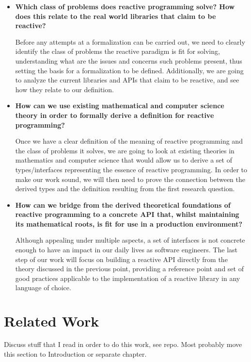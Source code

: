 \begin{itemize}
\item \textbf{Which class of problems does reactive programming solve? How does this relate to the real world libraries that claim to be reactive?}

Before any attempts at a formalization can be carried out, we need to clearly identify the class of problems the reactive paradigm is fit for solving, understanding what are the issues and concerns such problems present, thus setting the basis for a formalization to be defined. Additionally, we are going to analyze the current libraries and APIs that claim to be reactive, and see how they relate to our definition.

\item \textbf{How can we use existing mathematical and computer science theory in order to formally derive a definition for reactive programming?}

Once we have a clear definition of the meaning of reactive programming and the class of problems it solves, we are going to look at existing theories in mathematics and computer science that would allow us to derive a set of types/interfaces representing the essence of reactive programming. In order to make our work sound, we will then need to prove the connection between the derived types and the definition resulting from the first research question.

\item \textbf{How can we bridge from the derived theoretical foundations of reactive programming to a concrete API that, whilst maintaining its mathematical roots, is fit for use in a production environment?}

Although appealing under multiple aspects, a set of interfaces is not concrete enough to have an impact in our daily lives as software engineers. The last step of our work will focus on building a reactive API directly from the theory discussed in the previous point, providing a reference point and set of good practices applicable to the implementation of a reactive library in any language of choice.

\end{itemize}

\section*{Related Work}

Discuss stuff that I read in order to do this work, see repo. Most probably move this section to Introduction or separate chapter.


